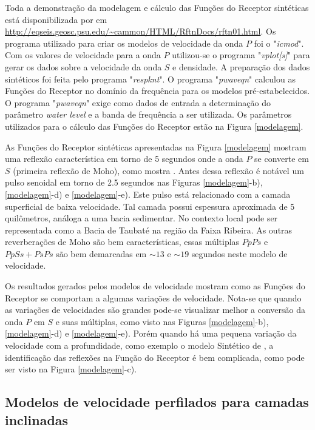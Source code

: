 Toda a demonstração da modelagem e cálculo das Funções do Receptor sintéticas está disponibilizada por \cite{Ammon_waterlevel_1997} em \url{http://eqseis.geosc.psu.edu/~cammon/HTML/RftnDocs/rftn01.html}. Os programa utilizado para criar os modelos de velocidade da onda $P$ foi o "\textit{icmod}". Com os valores de velocidade para a onda $P$ utilizou-se o programa "\textit{vplot[s]}" para gerar os dados sobre a velocidade da onda $S$ e densidade. A preparação dos dados sintéticos foi feita pelo programa "\textit{respknt}". O programa "\textit{pwaveqn}" calculou as Funções do Receptor no domínio da frequência para os modelos pré-estabelecidos. O programa "\textit{pwaveqn}" exige como dados de entrada a determinação do parâmetro \textit{water level} e a banda de frequência a ser utilizada. Os parâmetros utilizados para o cálculo das Funções do Receptor estão na Figura \ref{modelagem}.

As Funções do Receptor sintéticas apresentadas na Figura \ref{modelagem} mostram uma reflexão característica em torno de 5 segundos onde a onda $P$ se converte em $S$ (primeira reflexão de Moho), como mostra \cite{langston_structure_1979}. Antes dessa reflexão é notável um pulso senoidal em torno de 2.5 segundos nas Figuras \ref{modelagem}-b), \ref{modelagem}-d) e \ref{modelagem}-e). Este pulso está relacionado com a camada superficial de baixa velocidade. Tal camada possui espessura aproximada de 5 quilômetros, análoga a uma bacia sedimentar. No contexto local pode ser representada como a Bacia de Taubaté na região da Faixa Ribeira. As outras reverberações de Moho são bem características, essas múltiplas $PpPs$ e $PpSs+PsPs$ são bem demarcadas em $\sim 13$ e $\sim 19$ segundos neste modelo de velocidade.

Os resultados gerados pelos modelos de velocidade mostram como as Funções do Receptor se comportam a algumas variações de velocidade. Nota-se que quando as variações de velocidades são grandes pode-se visualizar melhor a conversão da onda $P$ em $S$ e suas múltiplas, como visto nas Figuras \ref{modelagem}-b), \ref{modelagem}-d) e \ref{modelagem}-e). Porém quando há uma pequena variação da velocidade com a profundidade, como exemplo o modelo Sintético de \cite{sand_franca_crustal_2004}, a identificação das reflexões na Função do Receptor é bem complicada, como pode ser visto na Figura \ref{modelagem}-c).

\subsection{Modelos de velocidade perfilados para camadas inclinadas}

